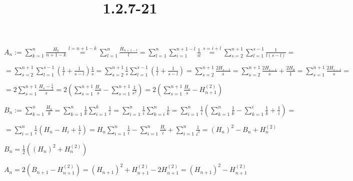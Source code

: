 \documentclass{article}
\title{1.2.7-21}
\begin{document}
\maketitle

$A_n := \sum_{k=1}^n\frac{H_k}{n+1-k} \overset{l = n + 1 - k}{=} \sum_{l=1}^n \frac{H_{n+1-l}}{l} = \sum_{l=1}^n \sum_{i=1}^{n+1-l}\frac{1}{il} \overset{s=i+l}{=} \sum_{s=2}^{n+1}\sum_{l=1}^{s-1}\frac{1}{l(s-l)} =$

$= \sum_{s=2}^{n+1}\sum_{l=1}^{s-1}(\frac{1}{l} + \frac{1}{s-l})\frac{1}{s} = \sum_{s=2}^{n+1}\frac{1}{s}\sum_{l=1}^{s-1}(\frac{1}{l} + \frac{1}{s-l}) = \sum_{s=2}^{n+1}\frac{2H_{s-1}}{s} = \sum_{s=2}^{n+1}\frac{2H_{s-1}}{s} + \frac{2H_0}{1} = \sum_{s=1}^{n+1}\frac{2H_{s-1}}{s} =$

$= 2 \sum_{s=1}^{n+1} \frac{H_s - \frac{1}{s}}{s} = 2 (\sum_{s=1}^{n+1} \frac{H_s}{s} - \sum_{s=1}^{n+1} \frac{1}{s^2}) = 2(\sum_{s=1}^{n+1} \frac{H_s}{s} - H_{n+1}^{(2)})$

$B_n := \sum_{k=1}^n \frac{H_k}{k} = \sum_{k=1}^{n}\frac{1}{k}\sum_{i=1}^k \frac{1}{i} = \sum_{i=1}^n \frac{1}{i}\sum_{k=i}^n \frac{1}{k} = \sum_{i=1}^n \frac{1}{i}(\sum_{k=1}^n \frac{1}{k} - \sum_{k=1}^i \frac{1}{k} + \frac{1}{i}) =$

$= \sum_{i=1}^n \frac{1}{i}(H_n - H_i + \frac{1}{i}) = H_n \sum_{i=1}^n \frac{1}{i} - \sum_{i=1}^n \frac{H_i}{i} + \sum_{i=1}^n \frac{1}{i^2} = (H_n)^2 - B_n + H_n^{(2)}$

$B_n = \frac{1}{2}((H_n)^2 + H_n^{(2)})$

$A_n = 2(B_{n+1} - H_{n+1}^{(2)}) = (H_{n+1})^2 + H_{n+1}^{(2)} - 2H_{n+1}^{(2)} = (H_{n+1})^2 - H_{n+1}^{(2)}$
\end{document}
